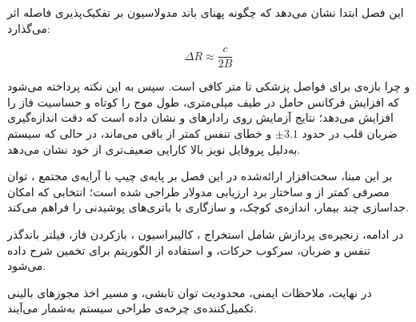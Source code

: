 این فصل ابتدا نشان می‌دهد که چگونه پهنای باند مدولاسیون بر تفکیک‌پذیری فاصله اثر می‌گذارد:

\begin{equation}
\Delta R \approx \frac{c}{2B}
\label{eq:range_resolution}
\end{equation}

و چرا بازه‌ی  برای فواصل پزشکی  تا  متر کافی است. سپس به این نکته پرداخته می‌شود که افزایش فرکانس حامل در طیف میلی‌متری، طول موج را کوتاه و حساسیت فاز را افزایش می‌دهد؛ نتایج آزمایش روی رادارهای  و  نشان داده است که دقت اندازه‌گیری ضربان قلب در حدود $\pm 3.1$  و خطای تنفس کمتر از  باقی می‌ماند، در حالی که سیستم  به‌دلیل پروفایل نویز بالا کارایی ضعیف‌تری از خود نشان می‌دهد.

بر این مبنا، سخت‌افزار ارائه‌شده در این فصل بر پایه‌ی چیپ  با آرایه‌ی مجتمع ، توان مصرفی کمتر از  و ساختار برد ارزیابی مدولار طراحی شده است؛ انتخابی که امکان جداسازی چند بیمار، اندازه‌ی کوچک، و سازگاری با باتری‌های پوشیدنی را فراهم می‌کند.

در ادامه، زنجیره‌ی پردازش شامل استخراج ، کالیبراسیون ، بازکردن فاز، فیلتر باندگذر تنفس و ضربان، سرکوب حرکات، و استفاده از الگوریتم  برای تخمین  شرح داده می‌شود.

در نهایت، ملاحظات ایمنی، محدودیت توان تابشی، و مسیر اخذ مجوزهای بالینی تکمیل‌کننده‌ی چرخه‌ی طراحی سیستم به‌شمار می‌آیند.
